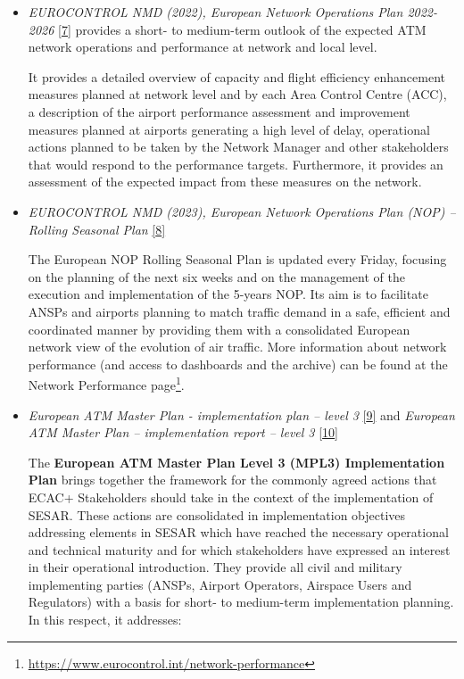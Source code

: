 \documentclass[
  11pt,
  a4paper,
]{book}
\DeclareRobustCommand{\href}[2]{#2\footnote{\url{#1}}}
\begin{document}
\begin{itemize}
\item
  \emph{EUROCONTROL NMD (2022), European Network Operations Plan
  2022-2026} \protect\hyperlink{ref-ectrl:nop:2022}{{[}7{]}} provides a
  short- to medium-term outlook of the expected ATM network operations
  and performance at network and local level.

  It provides a detailed overview of capacity and flight efficiency
  enhancement measures planned at network level and by each Area Control
  Centre (ACC), a description of the airport performance assessment and
  improvement measures planned at airports generating a high level of
  delay, operational actions planned to be taken by the Network Manager
  and other stakeholders that would respond to the performance targets.
  Furthermore, it provides an assessment of the expected impact from
  these measures on the network.
\item
  \emph{EUROCONTROL NMD (2023), European Network Operations Plan (NOP)
  -- Rolling Seasonal Plan}
  \protect\hyperlink{ref-ectrl:nop:rsp}{{[}8{]}}

  The European NOP Rolling Seasonal Plan is updated every Friday,
  focusing on the planning of the next six weeks and on the management
  of the execution and implementation of the 5-years NOP. Its aim is to
  facilitate ANSPs and airports planning to match traffic demand in a
  safe, efficient and coordinated manner by providing them with a
  consolidated European network view of the evolution of air traffic.
  More information about network performance (and access to dashboards
  and the archive) can be found at the
  \href{https://www.eurocontrol.int/network-performance}{Network
  Performance page}.
\item
  \emph{European ATM Master Plan - implementation plan -- level 3}
  \protect\hyperlink{ref-ectrl:mp:ip}{{[}9{]}} and \emph{European ATM
  Master Plan -- implementation report -- level 3}
  \protect\hyperlink{ref-ectrl:mp:ir}{{[}10{]}}

  The \textbf{European ATM Master Plan Level 3 (MPL3) Implementation
  Plan} brings together the framework for the commonly agreed actions
  that ECAC+ Stakeholders should take in the context of the
  implementation of SESAR. These actions are consolidated in
  implementation objectives addressing elements in SESAR which have
  reached the necessary operational and technical maturity and for which
  stakeholders have expressed an interest in their operational
  introduction. They provide all civil and military implementing parties
  (ANSPs, Airport Operators, Airspace Users and Regulators) with a basis
  for short- to medium-term implementation planning. In this respect, it
  addresses:


\end{itemize}
\end{document}
